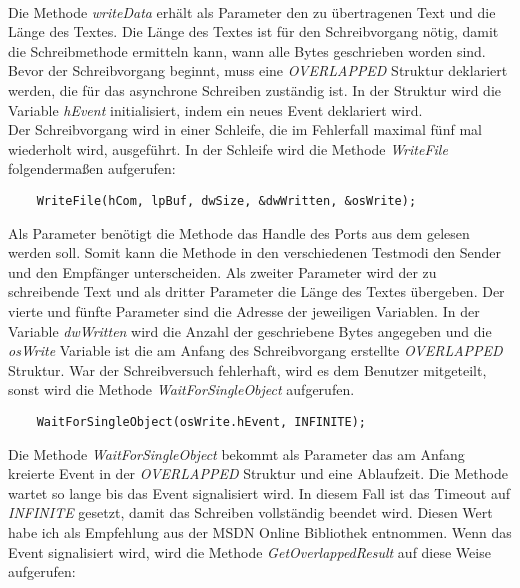 \paragraph{}
Die Methode \textit{writeData} erhält als Parameter den zu übertragenen Text und die Länge des Textes. Die Länge des Textes ist für den Schreibvorgang nötig, damit die Schreibmethode ermitteln kann, wann alle Bytes geschrieben worden sind. Bevor der Schreibvorgang beginnt, muss eine \textit{OVERLAPPED} Struktur deklariert werden, die für das asynchrone Schreiben zuständig ist. In der Struktur wird die Variable \textit{hEvent} initialisiert, indem ein neues Event deklariert wird.\\

Der Schreibvorgang wird in einer Schleife, die im Fehlerfall maximal fünf mal wiederholt wird, ausgeführt. In der Schleife wird die Methode \textit{WriteFile} folgendermaßen aufgerufen:
\begin{lstlisting}
	WriteFile(hCom, lpBuf, dwSize, &dwWritten, &osWrite);
\end{lstlisting}

Als Parameter benötigt die Methode das Handle des Ports aus dem gelesen werden soll. Somit kann die Methode in den verschiedenen Testmodi den Sender und den Empfänger unterscheiden. Als zweiter Parameter wird der zu schreibende Text und als dritter Parameter die Länge des Textes übergeben. Der vierte und fünfte Parameter sind die Adresse der jeweiligen Variablen. In der Variable \textit{dwWritten} wird die Anzahl der geschriebene Bytes angegeben und die \textit{osWrite} Variable ist die am Anfang des Schreibvorgang erstellte \textit{OVERLAPPED} Struktur. War der Schreibversuch fehlerhaft, wird es dem Benutzer mitgeteilt, sonst wird die Methode \textit{WaitForSingleObject} aufgerufen.

\begin{lstlisting}
	WaitForSingleObject(osWrite.hEvent, INFINITE);
\end{lstlisting}

Die Methode \textit{WaitForSingleObject} bekommt als Parameter das am Anfang kreierte Event in der \textit{OVERLAPPED} Struktur und eine Ablaufzeit. Die Methode wartet so lange bis das Event signalisiert wird. In diesem Fall ist das Timeout auf \textit{INFINITE} gesetzt, damit das Schreiben vollständig beendet wird. Diesen Wert habe ich als Empfehlung aus der MSDN Online Bibliothek\cite{SerialCommunications} entnommen. Wenn das Event signalisiert wird, wird die Methode \textit{GetOverlappedResult} auf diese Weise aufgerufen:

